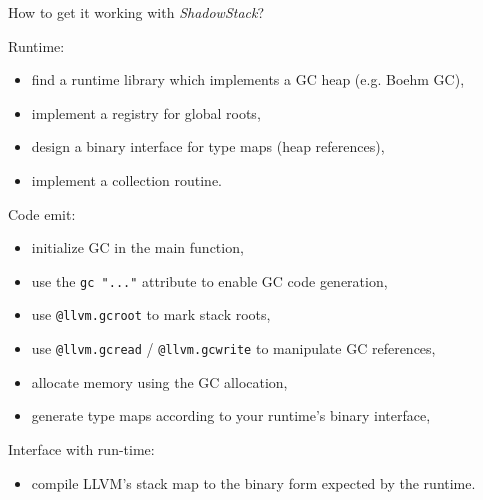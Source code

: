 \documentclass[8pt]{beamer}
\begin{document}
\begin{frame}[fragile]{How to get it working with \textit{ShadowStack}?}
  \begin{block}{Runtime:}
    \begin{itemize}
      \item find a runtime library which implements a GC heap (e.g. Boehm GC),
      \item implement a registry for global roots,
      \item design a binary interface for type maps (heap references),
      \item implement a collection routine.
    \end{itemize}
  \end{block}

  \begin{block}{Code emit:}
    \begin{itemize}
      \item initialize GC in the main function,
      \item use the \verb+gc "..."+ attribute to enable GC code generation,
      \item use \verb+@llvm.gcroot+ to mark stack roots,
      \item use \verb+@llvm.gcread+ / \verb+@llvm.gcwrite+ to manipulate GC
        references,
      \item allocate memory using the GC allocation,
      \item generate type maps according to your runtime's binary interface,
    \end{itemize}
  \end{block}

  \begin{block}{Interface with run-time:}
    \begin{itemize}
      \item compile LLVM's stack map to the binary form expected by the
        runtime.
    \end{itemize}
  \end{block}
\end{frame}
\end{document}
